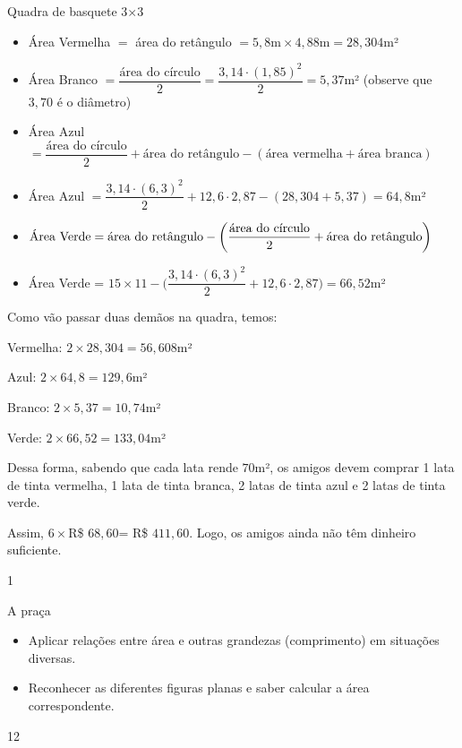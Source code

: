 \begin{answer}{Quadra de basquete 3$\times$3}
{
\begin{itemize}
\item   Área Vermelha $=$ área do retângulo $= 5,8 \text{m}\times4,88 \text{m} = 28,304$m²

\item Área Branco $=\dfrac{\text{área do círculo}}{2}=\dfrac{3{,}14\cdot(1{,}85)^2}{2}=5{,}37$m² (observe que $3{,}70$ é o diâmetro)

\item Área Azul $= \dfrac{\text{área do círculo}}{2}+\text{área do retângulo}-(\text{área vermelha}+\text{área branca})$

\item Área Azul $=\dfrac{3{,}14\cdot(6{,}3)^2}{2}+12{,}6\cdot2{,}87-(28{,}304+5{,}37)=64{,}8$m²
 
\item $\text{Área Verde}=\text{área do retângulo}-\\\bigg(\dfrac{\text{área do círculo}}{2}+\text{área do retângulo}\bigg)$

\item Área Verde = $15\times11-\bigg(\dfrac{3{,}14\cdot(6{,}3)^2}{2}+12{,}6\cdot2{,}87\bigg)=66{,}52$m²
\end{itemize}

Como vão passar duas demãos na quadra, temos:
\begin{itemize}[left=0pt]\setlength{\columnsep}{2cm}
\begin{multicols}{2}
\item Vermelha: $2\times28{,}304=56{,}608$m²
\item Azul: $2\times64{,}8=129{,}6$m²
\item Branco: $2\times5{,}37=10{,}74$m²
\item Verde: $2\times66{,}52=133,04$m²
\end{multicols}
\end{itemize}

Dessa forma, sabendo que cada lata rende $70$m², os amigos devem comprar 1 lata de tinta vermelha, 1 lata de tinta branca, 2 latas de tinta azul e 2 latas de tinta verde.

Assim, $6\times$R\$ $68{,}60$= R\$ $411{,}60$. Logo, os amigos ainda não têm dinheiro suficiente.

}{1}
\end{answer}
\begin{objectives}{A praça}
{
\begin{itemize}
\item Aplicar relações entre área e outras grandezas (comprimento) em situações diversas. 
\item Reconhecer as diferentes figuras planas e saber calcular a área correspondente.
\end{itemize}
}{1}{2}
\end{objectives}
